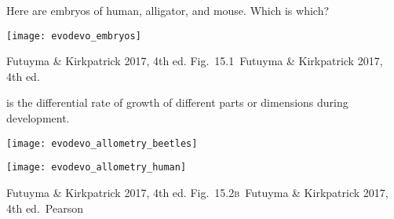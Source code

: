 \documentclass[t]{beamer}
\newcommand{\futuyma}[1]{%
	\ifthenelse{\isempty{#1}}%
	{Futuyma \& Kirkpatrick 2017, 4th ed.}%
	{Fig.~#1~Futuyma \& Kirkpatrick 2017, 4th ed.}%
}
\newcommand{\backskip}{\vspace{-0.5\baselineskip}}
\begin{document}

{
\begin{frame}[b]

\end{frame}
}

\begin{frame}{Here are embryos of human, alligator, and mouse. Which is which?}

\backskip

\texttt{[image: evodevo\_embryos]}

\pause



\tinyfill \futuyma{15.1}

\end{frame}


\begin{frame}{ is the differential rate of growth of different parts or dimensions during development.}

\backskip

\begin{multicols}{2}

\texttt{[image: evodevo\_allometry\_beetles]}
	
\columnbreak

\texttt{[image: evodevo\_allometry\_human]}

\end{multicols}

\vfilll

\tiny \futuyma{15.2\textsc{b}} \hfill \textcopyright\,Pearson

\end{frame}

\end{document}
